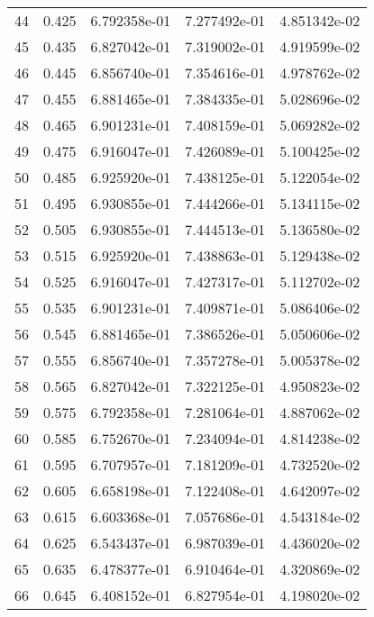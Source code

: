 \begin{table}[ht]
\begin{tabular}{rcccc}
    44 &  0.425 &    6.792358e-01 &    7.277492e-01  &     4.851342e-02\\ 
    45 &  0.435 &    6.827042e-01 &    7.319002e-01  &     4.919599e-02\\ 
    46 &  0.445 &    6.856740e-01 &    7.354616e-01  &     4.978762e-02\\ 
    47 &  0.455 &    6.881465e-01 &    7.384335e-01  &     5.028696e-02\\ 
    48 &  0.465 &    6.901231e-01 &    7.408159e-01  &     5.069282e-02\\ 
    49 &  0.475 &    6.916047e-01 &    7.426089e-01  &     5.100425e-02\\ 
    50 &  0.485 &    6.925920e-01 &    7.438125e-01  &     5.122054e-02\\ 
    51 &  0.495 &    6.930855e-01 &    7.444266e-01  &     5.134115e-02\\ 
    52 &  0.505 &    6.930855e-01 &    7.444513e-01  &     5.136580e-02\\ 
    53 &  0.515 &    6.925920e-01 &    7.438863e-01  &     5.129438e-02\\ 
    54 &  0.525 &    6.916047e-01 &    7.427317e-01  &     5.112702e-02\\ 
    55 &  0.535 &    6.901231e-01 &    7.409871e-01  &     5.086406e-02\\ 
    56 &  0.545 &    6.881465e-01 &    7.386526e-01  &     5.050606e-02\\ 
    57 &  0.555 &    6.856740e-01 &    7.357278e-01  &     5.005378e-02\\ 
    58 &  0.565 &    6.827042e-01 &    7.322125e-01  &     4.950823e-02\\ 
    59 &  0.575 &    6.792358e-01 &    7.281064e-01  &     4.887062e-02\\ 
    60 &  0.585 &    6.752670e-01 &    7.234094e-01  &     4.814238e-02\\ 
    61 &  0.595 &    6.707957e-01 &    7.181209e-01  &     4.732520e-02\\ 
    62 &  0.605 &    6.658198e-01 &    7.122408e-01  &     4.642097e-02\\ 
    63 &  0.615 &    6.603368e-01 &    7.057686e-01  &     4.543184e-02\\ 
    64 &  0.625 &    6.543437e-01 &    6.987039e-01  &     4.436020e-02\\ 
    65 &  0.635 &    6.478377e-01 &    6.910464e-01  &     4.320869e-02\\ 
    66 &  0.645 &    6.408152e-01 &    6.827954e-01  &     4.198020e-02\\ 

\end{tabular}
\end{table}
